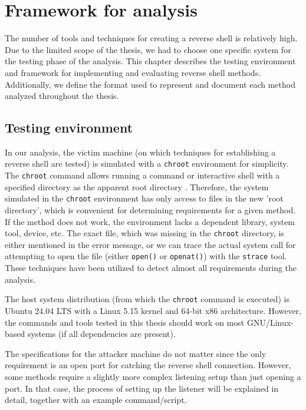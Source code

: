\chapter{Framework for analysis}
\label{chap:framework}

The number of tools and techniques for creating a reverse shell is relatively high. Due to the limited scope of the thesis, we had to choose one specific system for the testing phase of the analysis. This chapter describes the testing environment and framework for implementing and evaluating reverse shell methods. Additionally, we define the format used to represent and document each method analyzed throughout the thesis.

\section{Testing environment}
\label{testing-env}

In our analysis, the victim machine (on which techniques for establishing a reverse shell are tested) is simulated with a \texttt{chroot} environment for simplicity. The \texttt{chroot} command allows running a command or interactive shell with a specified directory as the apparent root directory \cite{chroot-man}. Therefore, the system simulated in the \texttt{chroot} environment has only access to files in the new 'root directory', which is convenient for determining requirements for a given method. If the method does not work, the environment lacks a dependent library, system tool, device, etc. The exact file, which was missing in the \texttt{chroot} directory, is either mentioned in the error message, or we can trace the actual system call for attempting to open the file (either \texttt{open()} or \texttt{openat()}) with the  \texttt{strace} tool. These techniques have been utilized to detect almost all requirements during the analysis.

The host system distribution (from which the \texttt{chroot} command is executed) is Ubuntu 24.04 LTS with a Linux 5.15 kernel and 64-bit x86 architecture. However, the commands and tools tested in this thesis should work on most GNU/Linux-based systems (if all dependencies are present).

The specifications for the attacker machine do not matter since the only requirement is an open port for catching the reverse shell connection. However, some methods require a slightly more complex listening setup than just opening a port. In that case, the process of setting up the listener will be explained in detail, together with an example command/script.


